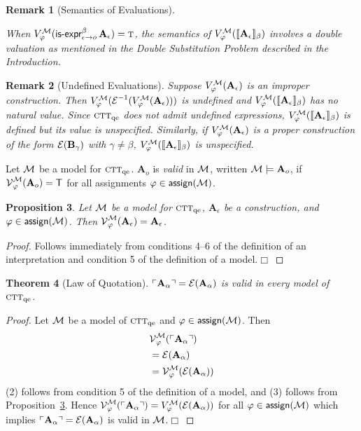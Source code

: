 \documentclass[fleqn]{llncs}
\newcommand{\bsp}{\begin{sloppypar}}
\newcommand{\esp}{\end{sloppypar}}
\newtheorem{thm}{Theorem}[subsection]
\newtheorem{prop}[thm]{Proposition}
\newtheorem{rem}[thm]{Remark}
\newcommand{\sE}{\mbox{$\cal E$}}
\newcommand{\sM}{\mbox{$\cal M$}}
\newcommand{\sV}{\mbox{$\cal V$}}
\renewcommand{\phi}{\varphi}
\newcommand{\churchqe}{$\mbox{\sc ctt}_{\rm qe}$}
\newcommand{\sembrack}[1]{\llbracket#1\rrbracket}
\newcommand{\synbrack}[1]{\ulcorner#1\urcorner}
\newcommand{\mname}[1]{\mbox{\sf #1}}
\newcommand{\tarrow}{\rightarrow}
\newcommand{\TRUE}{\mbox{{\sc t}}}
\begin{document}
\begin{rem}[Semantics of Evaluations]\em\bsp
When $V^{\cal M}_{\phi}(\mname{is-expr}_{\epsilon \tarrow o}^{\beta}
\, \textbf{A}_\epsilon) = \TRUE$, the semantics of $V^{\cal
  M}_{\phi}(\sembrack{\textbf{A}_\epsilon}_\beta)$ involves a double
valuation as mentioned in the Double Substitution Problem described in
the Introduction.\esp
\end{rem}

\begin{rem}[Undefined Evaluations]\em
Suppose $V^{\cal M}_{\phi}(\textbf{A}_\epsilon)$ is an improper
construction.  Then $V^{\cal M}_{\phi}(\sE^{-1}(V^{\cal
  M}_{\phi}(\textbf{A}_\epsilon)))$ is undefined and $V^{\cal
  M}_{\phi}(\sembrack{\textbf{A}_\epsilon}_\beta)$ has no natural
value.  Since {\churchqe} does not admit undefined expressions,
$V^{\cal M}_{\phi}(\sembrack{\textbf{A}_\epsilon}_\beta)$ is defined
but its value is unspecified. Similarly, if $V^{\cal
  M}_{\phi}(\textbf{A}_\epsilon)$ is a proper construction of the form
$\sE(\textbf{B}_\gamma)$ with $\gamma \not= \beta$, $V^{\cal
  M}_{\phi}(\sembrack{\textbf{A}_\epsilon}_\beta)$ is unspecified.
\end{rem}

Let $\sM$ be a model for {\churchqe}. $\textbf{A}_o$ is \emph{valid}
in $\sM$, written $\sM \models \textbf{A}_o$, if $\sV^{\cal
  M}_{\phi}(\textbf{A}_o) = \mname{T}$ for all assignments $\phi \in
\mname{assign}(\sM)$.

\begin{prop} \label{prop:val-const}
Let $\sM$ be a model for {\churchqe}, $\textbf{A}_\epsilon$ be a
construction, and $\phi \in \mname{assign}(\sM)$.  Then $\sV^{\cal
  M}_{\phi}(\textbf{A}_\epsilon) = \textbf{A}_\epsilon$.
\end{prop}

\begin{proof}
Follows immediately from conditions 4--6 of the definition of an
interpretation and condition 5 of the definition of a model.\hfill $\Box$
\end{proof}

\begin{thm}[Law of Quotation] \label{thm:quotation}
$\synbrack{\textbf{A}_\alpha} = \sE(\textbf{A}_\alpha)$ is valid in
  every model of {\churchqe}.
\end{thm}

\begin{proof}
Let $\sM$ be a model of {\churchqe} and $\phi \in
\mname{assign}(\sM)$.  Then 
\begin{align} \setcounter{equation}{0}
&
\sV^{\cal M}_{\phi}(\synbrack{\textbf{A}_\alpha}) \\
&=
\sE(\textbf{A}_\alpha) \\
&=
\sV^{\cal M}_{\phi}(\sE(\textbf{A}_\alpha))
\end{align}
(2) follows from condition 5 of the definition of a model, and (3)
follows from Proposition~\ref{prop:val-const}. Hence $\sV^{\cal
  M}_{\phi}(\synbrack{\textbf{A}_\alpha}) = V^{\cal
  M}_{\phi}(\sE(\textbf{A}_\alpha))$ for all $\phi \in
\mname{assign}(\sM)$ which implies $\synbrack{\textbf{A}_\alpha} =
\sE(\textbf{A}_\alpha)$ is valid in $\sM$.\hfill $\Box$
\end{proof}
\end{document}
